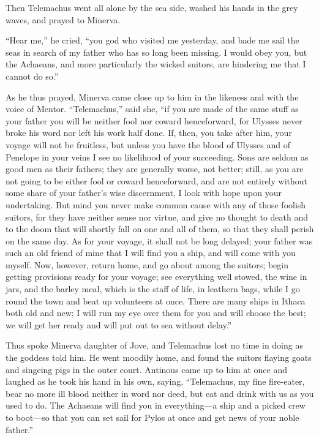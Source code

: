 Then Telemachus went all alone by the sea side, washed his hands in the grey
waves, and prayed to Minerva.

“Hear me,” he cried, “you god who visited me yesterday, and bade me sail the
seas in search of my father who has so long been missing. I would obey you, but
the Achaeans, and more particularly the wicked suitors, are hindering me that I
cannot do so.”

As he thus prayed, Minerva came close up to him in the likeness and with the
voice of Mentor. “Telemachus,” said she, “if you are made of the same stuff as
your father you will be neither fool nor coward henceforward, for Ulysses never
broke his word nor left his work half done. If, then, you take after him, your
voyage will not be fruitless, but unless you have the blood of Ulysses and of
Penelope in your veins I see no likelihood of your succeeding. Sons are seldom
as good men as their fathers; they are generally worse, not better; still, as
you are not going to be either fool or coward henceforward, and are not
entirely without some share of your father’s wise discernment, I look with hope
upon your undertaking. But mind you never make common cause with any of those
foolish suitors, for they have neither sense nor virtue, and give no thought to
death and to the doom that will shortly fall on one and all of them, so that
they shall perish on the same day. As for your voyage, it shall not be long
delayed; your father was such an old friend of mine that I will find you a
ship, and will come with you myself. Now, however, return home, and go about
among the suitors; begin getting provisions ready for your voyage; see
everything well stowed, the wine in jars, and the barley meal, which is the
staff of life, in leathern bags, while I go round the town and beat up
volunteers at once. There are many ships in Ithaca both old and new; I will run
my eye over them for you and will choose the best; we will get her ready and
will put out to sea without delay.”

Thus spoke Minerva daughter of Jove, and Telemachus lost no time in doing as
the goddess told him. He went moodily home, and found the suitors flaying goats
and singeing pigs in the outer court. Antinous came up to him at once and
laughed as he took his hand in his own, saying, “Telemachus, my fine
fire-eater, bear no more ill blood neither in word nor deed, but eat and drink
with us as you used to do. The Achaeans will find you in everything—a ship and
a picked crew to boot—so that you can set sail for Pylos at once and get news
of your noble father.”

